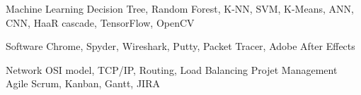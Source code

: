 \begin{cvskills}
\cvskill
    {Machine Learning} %
    {Decision Tree, Random Forest, K-NN, SVM, K-Means, ANN, CNN, HaaR cascade, TensorFlow, OpenCV } %


\cvskill
    {Software} %
    {Chrome, Spyder, Wireshark, Putty, Packet Tracer, Adobe After Effects } %

  \cvskill
    {Network} %
    {OSI model, TCP/IP, Routing, Load Balancing   } %
\cvskill
    {Projet Management} %
    {Agile Scrum, Kanban, Gantt, JIRA } %

\end{cvskills}
